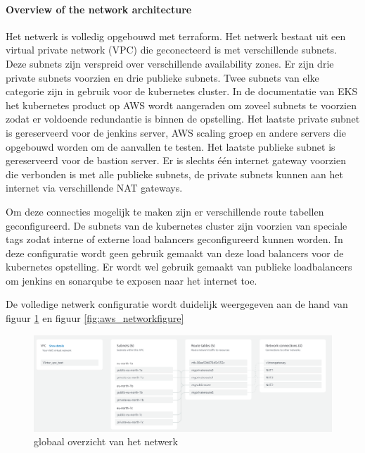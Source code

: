 \paragraph{
{Overview of the network architecture}}
\label{sec:Netwerkarchitectuur overzicht}

Het netwerk is volledig opgebouwd met terraform. Het netwerk bestaat uit een virtual private network (VPC) die geconecteerd is met verschillende subnets. Deze subnets zijn verspreid over verschillende availability zones. Er zijn drie private subnets voorzien en drie publieke subnets. Twee subnets van elke categorie zijn in gebruik voor de kubernetes cluster. In de documentatie van EKS het kubernetes product op AWS wordt aangeraden om zoveel subnets te voorzien zodat er voldoende redundantie is binnen de opstelling. Het laatste private subnet is gereserveerd voor de jenkins server, AWS scaling groep en andere servers die opgebouwd worden om de aanvallen te testen. Het laatste publieke subnet is gereserveerd voor de bastion server. Er is slechts één internet gateway voorzien die verbonden is met alle publieke subnets, de private subnets kunnen aan het internet via verschillende NAT gateways. 
\newline

Om deze connecties mogelijk te maken zijn er verschillende route tabellen geconfigureerd. De subnets van de kubernetes cluster zijn voorzien van speciale tags zodat interne of externe load balancers geconfigureerd kunnen worden. In deze configuratie wordt geen gebruik gemaakt van deze load balancers voor de kubernetes opstelling. Er wordt wel gebruik gemaakt van publieke loadbalancers om jenkins en sonarqube te exposen naar het internet toe.
\clearpage

De volledige netwerk configuratie wordt duidelijk weergegeven aan de hand van figuur \ref{fig:aws_network} en figuur \ref{fig:aws_networkfigure}

\begin{figure}[H]
  \includegraphics[scale=0.48]{graphics/aws_network.png}
\caption{\label{fig:aws_network} globaal overzicht van het netwerk}
\end{figure}

